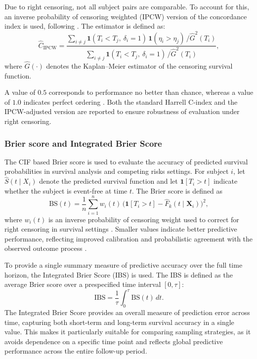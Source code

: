 \documentclass[a4paper,twoside,12pt]{report}
\begin{document}
Due to right censoring, not all subject pairs are comparable. To account for this, an inverse probability of censoring weighted (IPCW) version of the concordance index is used, following \cite{Uno2011}. The estimator is defined as:
\[
\widehat{C}_{\mathrm{IPCW}}
=
\frac{
\sum_{i \neq j}
\mathbf{1}(T_i < T_j,\ \delta_i = 1)\,
\mathbf{1}(\eta_i > \eta_j)\,
/ \hat G^2(T_i)
}{
\sum_{i \neq j}
\mathbf{1}(T_i < T_j,\ \delta_i = 1)\,
/ \hat G^2(T_i)
},
\]
where $\hat G(\cdot)$ denotes the Kaplan–Meier estimator of the censoring survival function.

A value of $0.5$ corresponds to performance no better than chance, whereas a value of $1.0$ indicates perfect ordering \cite{Harrell1982}. Both the standard Harrell C-index and the IPCW-adjusted version are reported to ensure robustness of evaluation under right censoring.

\subsubsection{Brier score and Integrated Brier Score}

The CIF based Brier score is used to evaluate the accuracy of predicted survival probabilities in survival analysis and competing risks settings. For subject $i$, let $\hat{S}(t\mid X_i)$ denote the predicted survival function and let $\mathbf{1}[T_i>t]$ indicate whether the subject is event-free at time $t$. The Brier score is defined as
\[
\mathrm{BS}(t)
=
\frac{1}{n}
\sum_{i=1}^n
w_i(t)\,
\bigl(\mathbf{1}[T_i>t]-\hat{F}_k(t\mid \boldsymbol{X}_i)\bigr)^2,
\]
where $w_i(t)$ is an inverse probability of censoring weight used to correct for right censoring in survival settings \cite{Graf1999}. Smaller values indicate better predictive performance, reflecting improved calibration and probabilistic agreement with the observed outcome process \cite{Schemper2009}.

To provide a single summary measure of predictive accuracy over the full time horizon, the Integrated Brier Score (IBS) is used. The IBS is defined as the average Brier score over a prespecified time interval $[0, \tau]$:
\[
\mathrm{IBS}
=
\frac{1}{\tau}
\int_0^{\tau}
\mathrm{BS}(t)\,dt.
\]
The Integrated Brier Score provides an overall measure of prediction error across time, capturing both short-term and long-term survival accuracy in a single value. This makes it particularly suitable for comparing sampling strategies, as it avoids dependence on a specific time point and reflects global predictive performance across the entire follow-up period.
\end{document}
